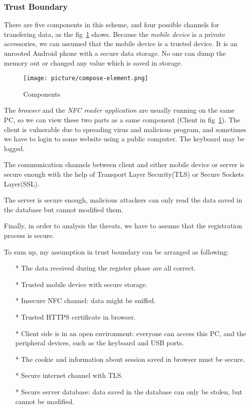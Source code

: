 \begin{CJK}{Bg5}{bsmi}
\subsubsection{Trust Boundary}

There are five components in this scheme, and four possible channels for transfering data, as the fig~\ref{fig:compose-element} shows. Because the \emph{mobile device} is a private accessories, we can assumed that the mobile device is a trusted device. It is an unrooted Android phone with a secure data storage. No one can dump the memory out or changed any value which is saved in storage.

\begin{figure}
\centering
\texttt{[image: picture/compose-element.png]}
\caption{Components}
\label{fig:compose-element}
\end{figure}

The \emph{browser} and the \emph{NFC reader application} are usually running on the same PC, so we can view these two parts as a same component (Client in fig~\ref{fig:compose-element}). The client is vulnerable due to spreading virus and malicious program, and sometimes we have to login to some website using a public computer. The keyboard may be logged. 

The communication channels between client and either mobile device or server is secure enough with the help of Transport Layer Security(TLS) or Secure Sockets Layer(SSL). 

The server is secure enough, malicious attackers can only read the data saved in the database but cannot modified them.

Finally, in order to analysis the threats, we have to assume that the registration process is secure. 

To sum up, my assumption in trust boundary can be arranged as following:
\begin{enumerate}
\item[*] The data received during the register phase are all correct.
\item[*] Trusted mobile device with secure storage.
\item[*] Insecure NFC channel: data might be sniffed.
\item[*] Trusted HTTPS certificate in browser.
\item[*] Client side is in an open environment: everyone can access this PC, and the peripheral devices, such as the keyboard and USB ports.
\item[*] The cookie and information about session saved in browser must be secure.
\item[*] Secure internet channel with TLS.
\item[*] Secure server database: data saved in the database can only be stolen, but cannot be modified.
\end{enumerate}


\end{CJK}
